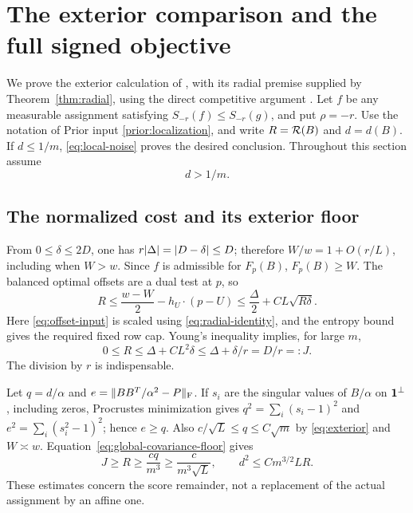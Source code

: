 \section{The exterior comparison and the full signed objective}
\label{sec:assembly}
We prove the exterior calculation of \cite{assembly}, with its radial
premise supplied by Theorem~\ref{thm:radial}, using the direct competitive
argument \cite{direct}. Let $f$ be any measurable assignment satisfying
$S_{-r}(f)\le S_{-r}(g)$, and put $\rho=-r$. Use the notation of Prior input
\ref{prior:localization}, and write $R=\mathcal R(B)$ and $d=d(B)$.
If $d\le1/m$, \eqref{eq:local-noise} proves the desired conclusion.
Throughout this section assume
\begin{equation}\label{eq:exterior}
                              d>1/m.
\end{equation}

\subsection{The normalized cost and its exterior floor}
From $0\le\delta\le2D$, one has
$r\lvert \Delta\rvert=\lvert D-\delta\rvert\le D$; therefore
$W/w=1+O(r/L)$, including when $W>w$.
Since $f$ is admissible for $F_p(B)$, $F_p(B)\ge W$.
The balanced optimal offsets are a dual test at $p$, so
\[
 R\le\frac{w-W}{2}-h_U\cdot(p-U)
       \le\frac\Delta2+CL\sqrt{R\delta}.
\]
Here \eqref{eq:offset-input} is scaled using
\eqref{eq:radial-identity}, and the entropy bound gives the required
fixed row cap. Young's inequality implies, for large $m$,
\begin{equation}\label{eq:Rpaid}
              0\le R\le\Delta+CL^2\delta
                   \le\Delta+\delta/r=D/r=:J.
\end{equation}
The division by $r$ is indispensable.

Let $q=d/\alpha$ and $e=\lVert BB^T/\alpha^2-P\rVert_{\mathrm F}$.
If $s_i$ are the singular values of $B/\alpha$ on $\mathbf 1^\perp$,
including zeros, Procrustes minimization gives
$q^2=\sum_i(s_i-1)^2$ and $e^2=\sum_i(s_i^2-1)^2$; hence $e\ge q$.
Also $c/\sqrt L\le q\le C\sqrt m$ by \eqref{eq:exterior} and
$W\asymp w$. Equation~\eqref{eq:global-covariance-floor} gives
\begin{equation}\label{eq:exteriorfloor}
 J\ge R\ge\frac{cq}{m^3}\ge\frac{c}{m^3\sqrt L},
                   \qquad d^2\le C m^{3/2}L R.
\end{equation}
These estimates concern the score remainder, not a replacement of the
actual assignment by an affine one.


